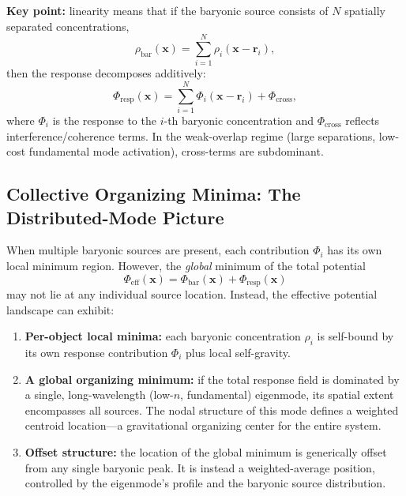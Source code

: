 \textbf{Key point:} linearity means that if the baryonic source consists of $N$ 
spatially separated concentrations,
\[
  \rho_{\text{bar}}(\mathbf{x}) = \sum_{i=1}^{N} \rho_i(\mathbf{x} - \mathbf{r}_i),
\]
then the response decomposes additively:
\begin{equation}
  \Phi_{\text{resp}}(\mathbf{x}) = \sum_{i=1}^{N} \Phi_i(\mathbf{x} - \mathbf{r}_i) 
  + \Phi_{\text{cross}},
\label{eq:distributed-superposition}
\end{equation}
where $\Phi_i$ is the response to the $i$-th baryonic concentration and $\Phi_{\text{cross}}$ 
reflects interference/coherence terms. In the weak-overlap regime (large separations, 
low-cost fundamental mode activation), cross-terms are subdominant.

\subsection{Collective Organizing Minima: The Distributed-Mode Picture}\label{e.3-collective-minima}

When multiple baryonic sources are present, each contribution $\Phi_i$ has its own local 
minimum region. However, the \textit{global} minimum of the total potential
\begin{equation}
  \Phi_{\text{eff}}(\mathbf{x}) = \Phi_{\text{bar}}(\mathbf{x}) + \Phi_{\text{resp}}(\mathbf{x})
\label{eq:total-effective-potential}
\end{equation}
may not lie at any individual source location. Instead, the effective potential landscape 
can exhibit:

\begin{enumerate}
  \item \textbf{Per-object local minima:} each baryonic concentration $\rho_i$ is self-bound 
    by its own response contribution $\Phi_i$ plus local self-gravity.
  
  \item \textbf{A global organizing minimum:} if the total response field is dominated by 
    a single, long-wavelength (low-$n$, fundamental) eigenmode, its spatial extent encompasses 
    all sources. The nodal structure of this mode defines a weighted centroid location---a 
    gravitational organizing center for the entire system.
  
  \item \textbf{Offset structure:} the location of the global minimum is generically offset 
    from any single baryonic peak. It is instead a weighted-average position, controlled by 
    the eigenmode's profile and the baryonic source distribution.
\end{enumerate}

